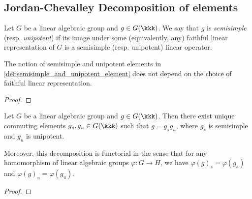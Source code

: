 \subsection{Jordan-Chevalley Decomposition of elements}

    
    \begin{definition}\label{def:semisimple_and_unipotent_element}
        Let \(G\) be a linear algebraic group and \(g \in G(\kkk)\). 
        We say that \(g\) is \emph{semisimple} (resp. \emph{unipotent}) if its image under some (equivalently, any) faithful linear representation of \(G\) is a semisimple (resp. unipotent) linear operator.
    \end{definition}



    \begin{lemma}\label{lem:semisimple_and_unipotent_elements_do_not_depend_on_faithful_representation}
        The notion of semisimple and unipotent elements in \cref{def:semisimple_and_unipotent_element} does not depend on the choice of faithful linear representation.
    \end{lemma}
    \begin{proof}
    \end{proof}

    \begin{theorem}\label{thm:jordan_chevalley_decomposition}
        Let \(G\) be a linear algebraic group and \(g \in G(\kkk)\). 
        Then there exist unique commuting elements \(g_s, g_u \in G(\kkk)\) such that \(g = g_s g_u\), where \(g_s\) is semisimple and \(g_u\) is unipotent.

        Moreover, this decomposition is functorial in the sense that for any homomorphism of linear algebraic groups \(\varphi: G \to H\), we have \(\varphi(g)_s = \varphi(g_s)\) and \(\varphi(g)_u = \varphi(g_u)\).
    \end{theorem}
    \begin{proof}
    \end{proof}



